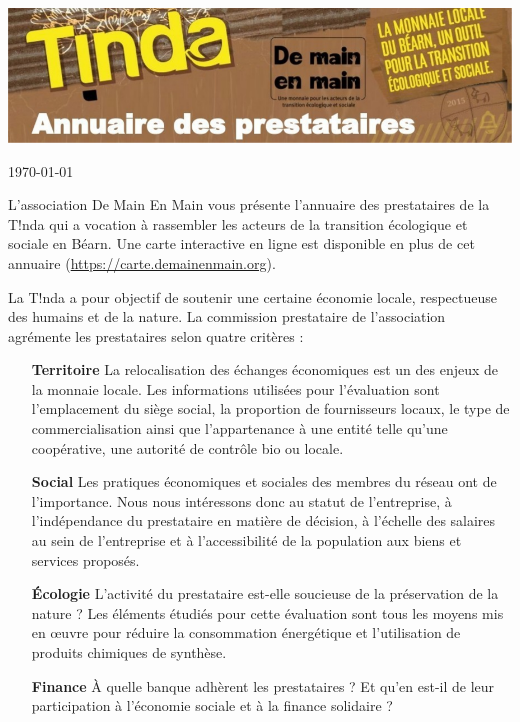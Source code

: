 
  \begin{center}
    \includegraphics[width=\linewidth]{bandeau_tinda.png}
  \end{center}
\today

    \vspace{.5cm}
    \noindent L’association De Main En Main vous présente l’annuaire des prestataires de la T!nda qui a
vocation à rassembler les acteurs de la transition écologique et sociale en Béarn. Une carte interactive en ligne
    est disponible en plus de cet annuaire (\url{https://carte.demainenmain.org}).
    \vspace{.5cm}

    \noindent La T!nda a pour objectif de soutenir une certaine économie locale, respectueuse des humains et de la nature. La commission prestataire 
    de l'association agrémente les prestataires selon quatre critères :
    \vspace{.2cm}
    \begin{itemize}
      \item[\textbf{Territoire}]  La relocalisation des échanges économiques est un des enjeux de la monnaie locale. 
        Les informations utilisées pour l'évaluation sont l’emplacement du siège social, la proportion de fournisseurs locaux, le
type de commercialisation ainsi que l’appartenance à une entité telle qu’une coopérative, une autorité de contrôle bio
ou locale.
    \vspace{.2cm}
\item[\textbf{Social}] Les pratiques économiques et sociales des membres du réseau ont de l'importance. Nous nous intéressons donc au statut de
l’entreprise, à l’indépendance du prestataire en matière de décision, à l’échelle des salaires au sein de l’entreprise
et à l’accessibilité de la population aux biens et services proposés.
    \vspace{.2cm}
\item[\textbf{Écologie}] L’activité du prestataire est-elle soucieuse de la préservation de la nature ? Les éléments étudiés pour cette
évaluation sont tous les moyens mis en œuvre pour réduire la consommation énergétique et l’utilisation de produits
chimiques de synthèse.
    \vspace{.2cm}
\item[\textbf{Finance}] À quelle banque adhèrent les prestataires ? Et qu’en est-il de leur participation à l’économie sociale et à la
finance solidaire ?
    \end{itemize}


